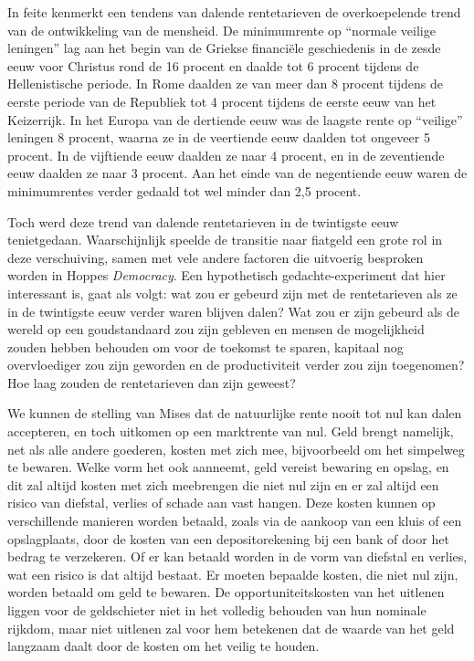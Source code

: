 \begin{blockquotebox}
    In feite kenmerkt een tendens van dalende rentetarieven de overkoepelende trend van de ontwikkeling van de mensheid. De minimumrente op ``normale veilige leningen'' lag aan het begin van de Griekse financiële geschiedenis in de zesde eeuw voor Christus rond de 16 procent en daalde tot 6 procent tijdens de Hellenistische periode. In Rome daalden ze van meer dan 8 procent tijdens de eerste periode van de Republiek tot 4 procent tijdens de eerste eeuw van het Keizerrijk. In het Europa van de dertiende eeuw was de laagste rente op ``veilige'' leningen 8 procent, waarna ze in de veertiende eeuw daalden tot ongeveer 5 procent. In de vijftiende eeuw daalden ze naar 4 procent, en in de zeventiende eeuw daalden ze naar 3 procent. Aan het einde van de negentiende eeuw waren de minimumrentes verder gedaald tot wel minder dan 2,5 procent.\footnotemark
\end{blockquotebox}
\autocite{164}

Toch werd deze trend van dalende rentetarieven in de twintigste eeuw tenietgedaan. Waarschijnlijk speelde de transitie naar fiatgeld een grote rol in deze verschuiving, samen met vele andere factoren die uitvoerig besproken worden in Hoppe\textquotesingle s \emph{Democracy}. Een hypothetisch gedachte-experiment dat hier interessant is, gaat als volgt: wat zou er gebeurd zijn met de rentetarieven als ze in de twintigste eeuw verder waren blijven dalen? Wat zou er zijn gebeurd als de wereld op een goudstandaard zou zijn gebleven en mensen de mogelijkheid zouden hebben behouden om voor de toekomst te sparen, kapitaal nog overvloediger zou zijn geworden en de productiviteit verder zou zijn toegenomen? Hoe laag zouden de rentetarieven dan zijn geweest?

We kunnen de stelling van Mises dat de natuurlijke rente nooit tot nul kan dalen accepteren, en toch uitkomen op een marktrente van nul. Geld brengt namelijk, net als alle andere goederen, kosten met zich mee, bijvoorbeeld om het simpelweg te bewaren. Welke vorm het ook aanneemt, geld vereist bewaring en opslag, en dit zal altijd kosten met zich meebrengen die niet nul zijn en er zal altijd een risico van diefstal, verlies of schade aan vast hangen. Deze kosten kunnen op verschillende manieren worden betaald, zoals via de aankoop van een kluis of een opslagplaats, door de kosten van een depositorekening bij een bank of door het bedrag te verzekeren. Of er kan betaald worden in de vorm van diefstal en verlies, wat een risico is dat altijd bestaat. Er moeten bepaalde kosten, die niet nul zijn, worden betaald om geld te bewaren. De opportuniteitskosten van het uitlenen liggen voor de geldschieter niet in het volledig behouden van hun nominale rijkdom, maar niet uitlenen zal voor hem betekenen dat de waarde van het geld langzaam daalt door de kosten om het veilig te houden.

